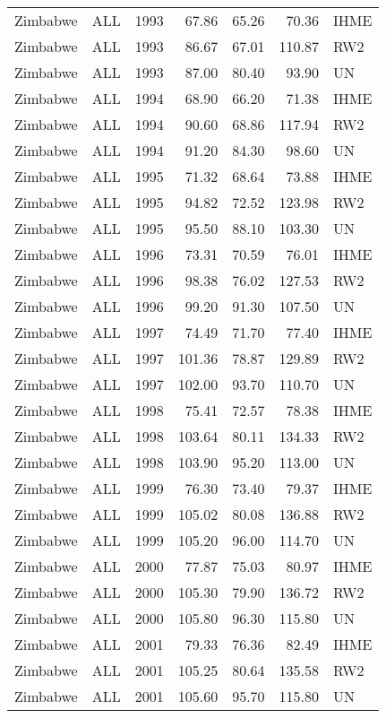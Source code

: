 \begin{longtable}{lllrrrl}
  Zimbabwe & ALL & 1993 & 67.86 & 65.26 & 70.36 & IHME \\ 
  Zimbabwe & ALL & 1993 & 86.67 & 67.01 & 110.87 & RW2 \\ 
  Zimbabwe & ALL & 1993 & 87.00 & 80.40 & 93.90 & UN \\ 
  Zimbabwe & ALL & 1994 & 68.90 & 66.20 & 71.38 & IHME \\ 
  Zimbabwe & ALL & 1994 & 90.60 & 68.86 & 117.94 & RW2 \\ 
  Zimbabwe & ALL & 1994 & 91.20 & 84.30 & 98.60 & UN \\ 
  Zimbabwe & ALL & 1995 & 71.32 & 68.64 & 73.88 & IHME \\ 
  Zimbabwe & ALL & 1995 & 94.82 & 72.52 & 123.98 & RW2 \\ 
  Zimbabwe & ALL & 1995 & 95.50 & 88.10 & 103.30 & UN \\ 
  Zimbabwe & ALL & 1996 & 73.31 & 70.59 & 76.01 & IHME \\ 
  Zimbabwe & ALL & 1996 & 98.38 & 76.02 & 127.53 & RW2 \\ 
  Zimbabwe & ALL & 1996 & 99.20 & 91.30 & 107.50 & UN \\ 
  Zimbabwe & ALL & 1997 & 74.49 & 71.70 & 77.40 & IHME \\ 
  Zimbabwe & ALL & 1997 & 101.36 & 78.87 & 129.89 & RW2 \\ 
  Zimbabwe & ALL & 1997 & 102.00 & 93.70 & 110.70 & UN \\ 
  Zimbabwe & ALL & 1998 & 75.41 & 72.57 & 78.38 & IHME \\ 
  Zimbabwe & ALL & 1998 & 103.64 & 80.11 & 134.33 & RW2 \\ 
  Zimbabwe & ALL & 1998 & 103.90 & 95.20 & 113.00 & UN \\ 
  Zimbabwe & ALL & 1999 & 76.30 & 73.40 & 79.37 & IHME \\ 
  Zimbabwe & ALL & 1999 & 105.02 & 80.08 & 136.88 & RW2 \\ 
  Zimbabwe & ALL & 1999 & 105.20 & 96.00 & 114.70 & UN \\ 
  Zimbabwe & ALL & 2000 & 77.87 & 75.03 & 80.97 & IHME \\ 
  Zimbabwe & ALL & 2000 & 105.30 & 79.90 & 136.72 & RW2 \\ 
  Zimbabwe & ALL & 2000 & 105.80 & 96.30 & 115.80 & UN \\ 
  Zimbabwe & ALL & 2001 & 79.33 & 76.36 & 82.49 & IHME \\ 
  Zimbabwe & ALL & 2001 & 105.25 & 80.64 & 135.58 & RW2 \\ 
  Zimbabwe & ALL & 2001 & 105.60 & 95.70 & 115.80 & UN \\ 

\end{longtable}
